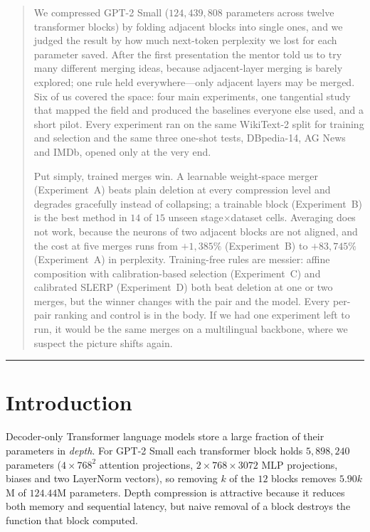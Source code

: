 \documentclass[10pt,a4paper]{article}
\begin{document}
\begin{abstract}
\small
We compressed GPT-2 Small ($124{,}439{,}808$ parameters across twelve
transformer blocks) by folding adjacent blocks into single ones, and we judged
the result by how much next-token perplexity we lost for each parameter saved.
After the first presentation the mentor told us to try many different merging
ideas, because adjacent-layer merging is barely explored; one rule held
everywhere---only adjacent layers may be merged. Six of us covered the space:
four main experiments, one tangential study that mapped the field and produced
the baselines everyone else used, and a short pilot. Every experiment ran on
the same WikiText-2 split for training and selection and the same three one-shot
tests, DBpedia-14, AG News and IMDb, opened only at the very end.

Put simply, trained merges win. A learnable weight-space merger
(Experiment~A) beats plain deletion at every compression level and degrades
gracefully instead of collapsing; a trainable block (Experiment~B) is the best
method in $14$ of $15$ unseen stage$\times$dataset cells. Averaging does not
work, because the neurons of two adjacent blocks are not aligned, and the cost
at five merges runs from $+1{,}385\%$ (Experiment~B) to $+83{,}745\%$
(Experiment~A) in perplexity. Training-free rules are messier: affine
composition with calibration-based selection (Experiment~C) and calibrated
SLERP (Experiment~D) both beat deletion at one or two merges, but the winner
changes with the pair and the model. Every per-pair ranking and control is in
the body. If we had one experiment left to run, it would be the same merges on
a multilingual backbone, where we suspect the picture shifts again.
\end{abstract}

\hrule height 0.4pt
\vspace{0.4em}

\section{Introduction}

Decoder-only Transformer language models
\citep{vaswani2017attention,radford2019language} store a large fraction of
their parameters in \emph{depth}. For GPT-2 Small each transformer block holds
$5{,}898{,}240$ parameters ($4\times768^2$ attention projections,
$2\times768\times3072$ MLP projections, biases and two LayerNorm vectors), so
removing $k$ of the $12$ blocks removes $5.90k$M of $124.44$M parameters. Depth
compression is attractive because it reduces both memory and sequential
latency, but naive removal of a block destroys the function that block computed.
\end{document}
